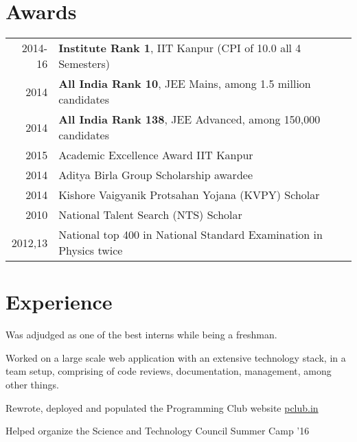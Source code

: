 \documentclass[a4paper]{deedy-resume} %
\begin{document}
\hfill
\begin{minipage}[t]{0.66\textwidth}

\section{Awards}

\begin{tabular}{rll}
  2014-16	 & \textbf{Institute Rank 1}, IIT Kanpur (CPI of 10.0 all 4 Semesters)\\
  2014	 & \textbf{All India Rank 10}, JEE Mains, among 1.5 million candidates\\
  2014	 & \textbf{All India Rank 138}, JEE Advanced, among 150,000 candidates\\
  2015	 & Academic Excellence Award IIT Kanpur\\
  2014   & Aditya Birla Group Scholarship awardee\\
  2014   & Kishore Vaigyanik Protsahan Yojana (KVPY) Scholar\\
  2010   & National Talent Search (NTS) Scholar\\
  2012,13 & National top 400 in National Standard Examination
                     in Physics twice
\end{tabular}

\sectionspace %


\section{Experience}

\runsubsection{}

\vspace{\topsep}
\begin{tightitemize}
  \item Was adjudged as one of the best interns while being a freshman.
  \item Worked on a large scale web application with an extensive technology stack, in a team setup, comprising of code reviews, documentation, management, among other things.
\end{tightitemize}

\sectionspace

\runsubsection{}
\begin{tightitemize}
  \item Rewrote, deployed and populated the Programming Club website \href{https://pclub.in}{pclub.in}
  \item Helped organize the Science and Technology Council Summer Camp
    '16
\end{tightitemize}


\end{minipage}
\end{document}
